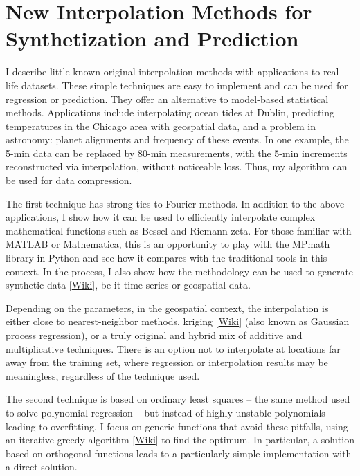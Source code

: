 \documentclass[oneside,10pt]{book}
\newcommand\Chapter[2]{
  \chapter[#1]{#1\\[2ex]\Large\itshape#2}
}
\begin{document}
\Chapter{New Interpolation Methods  for Synthetization and Prediction}{}\label{chapterInterpol}


  I describe little-known original interpolation methods with applications to real-life datasets. These simple techniques are easy to implement and can be used for regression or prediction. They offer an alternative to model-based statistical methods. Applications include interpolating ocean tides at Dublin, predicting temperatures in the Chicago area with geospatial data, and a problem in astronomy:  planet alignments and frequency of these events. In one example, the 5-min data can be replaced by 80-min measurements, with the 5-min increments reconstructed via interpolation, without noticeable loss. Thus, my algorithm can be used for data compression.

The first technique has strong ties to Fourier methods. In addition to the above applications, I show how it can be used to efficiently interpolate complex mathematical functions such as Bessel and Riemann zeta. For those familiar with MATLAB or Mathematica, this is an opportunity to play with the MPmath library in Python and see how it compares with the traditional tools in this context.
In the process, I also show how the methodology can be used to
generate \textcolor{index}{synthetic data} [\href{https://en.wikipedia.org/wiki/Synthetic_data}{Wiki}], be it time series or geospatial data.

Depending on the parameters, in the geospatial context, the interpolation is either close to nearest-neighbor methods,
\textcolor{index}{kriging} [\href{https://en.wikipedia.org/wiki/Kriging}{Wiki}] (also known as Gaussian process regression), or a truly original and hybrid mix of additive and multiplicative techniques. There is an option not to interpolate at locations far away from the training set, where regression or interpolation results may be meaningless, regardless of the technique used.

The second technique is based on ordinary least squares -- the same method used to solve polynomial regression -- but instead of highly unstable polynomials leading to overfitting, I focus on generic functions that avoid these pitfalls, using an iterative
\textcolor{index}{greedy algorithm} [\href{https://en.wikipedia.org/wiki/Greedy_algorithm}{Wiki}] to find the optimum. In particular, a solution based on orthogonal functions leads to a particularly simple implementation with a direct solution.
\end{document}
